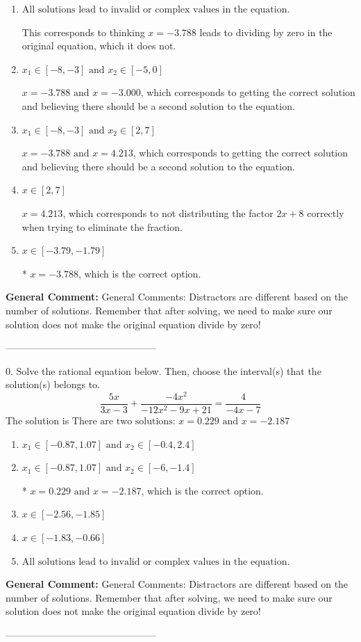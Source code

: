 \documentclass{extbook}[14pt]
\begin{document}
\begin{enumerate}[label=\Alph*.] 
\item $ \text{All solutions lead to invalid or complex values in the equation.} $ 

 This corresponds to thinking $x = -3.788$ leads to dividing by zero in the original equation, which it does not. 
\item $ x_1 \in [-8, -3] \text{ and } x_2 \in [-5,0] $ 

 $x = -3.788 \text{ and } x = -3.000$, which corresponds to getting the correct solution and believing there should be a second solution to the equation. 
\item $ x_1 \in [-8, -3] \text{ and } x_2 \in [2,7] $ 

 $x = -3.788 \text{ and } x = 4.213$, which corresponds to getting the correct solution and believing there should be a second solution to the equation. 
\item $ x \in [2,7] $ 

 $x = 4.213$, which corresponds to not distributing the factor $2x + 8$ correctly when trying to eliminate the fraction. 
\item $ x \in [-3.79,-1.79] $ 

 * $x = -3.788$, which is the correct option. 
\end{enumerate} 
 
\textbf{General Comment:} General Comments: Distractors are different based on the number of solutions. Remember that after solving, we need to make sure our solution does not make the original equation divide by zero! 

-----------------------------------------------

0. Solve the rational equation below. Then, choose the interval(s) that the solution(s) belongs to.
\[ \frac{5x}{3x -3} + \frac{-4x^{2}}{-12x^{2} -9 x + 21} = \frac{4}{-4x -7} \] 
The solution is $ \text{There are two solutions: } x = 0.229 \text{ and } x = -2.187 $ 

\begin{enumerate}[label=\Alph*.] 
\item $ x_1 \in [-0.87, 1.07] \text{ and } x_2 \in [-0.4,2.4] $ 

  
\item $ x_1 \in [-0.87, 1.07] \text{ and } x_2 \in [-6,-1.4] $ 

 * $x = 0.229 \text{ and } x = -2.187$, which is the correct option. 
\item $ x \in [-2.56,-1.85] $ 

  
\item $ x \in [-1.83,-0.66] $ 

  
\item $ \text{All solutions lead to invalid or complex values in the equation.} $ 

  
\end{enumerate} 
 
\textbf{General Comment:} General Comments: Distractors are different based on the number of solutions. Remember that after solving, we need to make sure our solution does not make the original equation divide by zero! 

-----------------------------------------------
\end{document}
